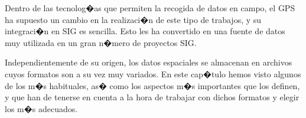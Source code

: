 Dentro de las tecnolog�as que permiten la recogida de datos en campo, el GPS ha supuesto un cambio en la realizaci�n de este tipo de trabajos, y su integraci�n en SIG es sencilla. Esto les ha convertido en una fuente de datos muy utilizada en un gran n�mero de proyectos SIG.

Independientemente de su origen, los datos espaciales se almacenan en archivos cuyos formatos son a su vez muy variados. En este cap�tulo hemos visto algunos de los m�s habituales, as� como los aspectos m�s importantes que los definen, y que han de tenerse en cuenta a la hora de trabajar con dichos formatos y elegir los m�s adecuados.

\pagestyle{empty}